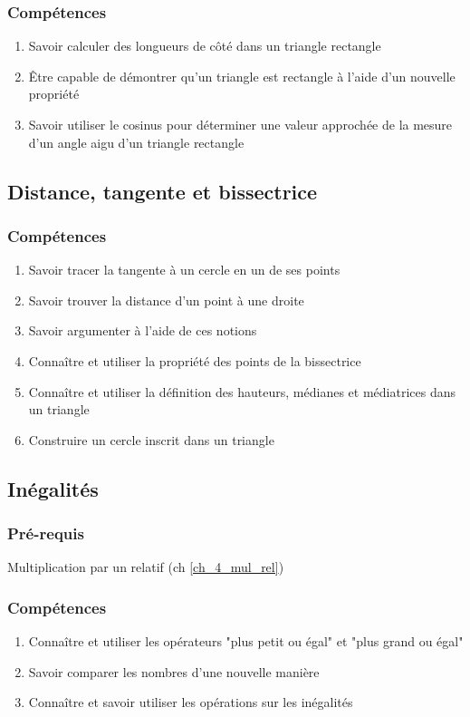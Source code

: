 \subsubsection*{Compétences}
\begin{enumerate}
	\item Savoir calculer des longueurs de côté dans un triangle rectangle
	\item Être capable de démontrer qu'un triangle est rectangle à l'aide d'un nouvelle propriété
	\item Savoir utiliser le cosinus pour déterminer une valeur approchée de la mesure d'un angle aigu d'un triangle rectangle
\end{enumerate}

\subsection{Distance, tangente et bissectrice}\label{ch_4_dist}

\subsubsection*{Compétences}
\begin{enumerate}
	\item Savoir tracer la tangente à un cercle en un de ses points
	\item Savoir trouver la distance d'un point à une droite
	\item Savoir argumenter à l'aide de ces notions
	\item Connaître et utiliser la propriété des points de la bissectrice
	\item Connaître et utiliser la définition des hauteurs, médianes et médiatrices dans un triangle 
	\item Construire un cercle inscrit dans un triangle
\end{enumerate}


	


\subsection{Inégalités}\label{ch_4_ineg}
\subsubsection*{Pré-requis}
Multiplication par un relatif (ch \ref{ch_4_mul_rel})

\subsubsection*{Compétences}
\begin{enumerate}
	\item Connaître et utiliser les opérateurs "plus petit ou égal" et "plus grand ou égal"
	\item Savoir comparer les nombres d'une nouvelle manière
	\item Connaître et savoir utiliser les opérations sur les inégalités
\end{enumerate}

